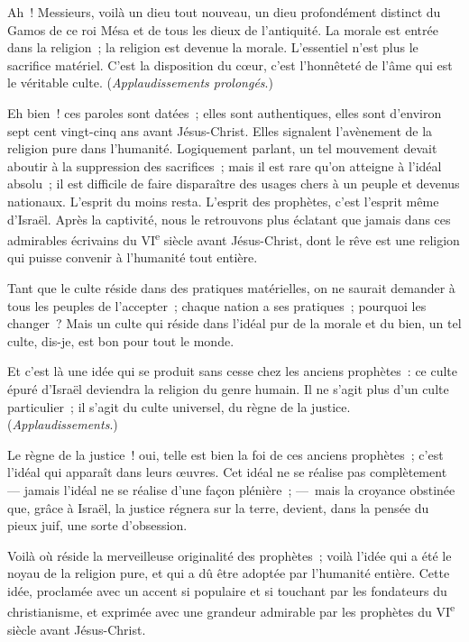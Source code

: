 \documentclass[french,twoside]{book} %
\newcommand\orgName[1]{#1}
\newcommand\persName[1]{#1}
\newcommand\placeName[1]{#1}
\begin{document}
\noindent Ah ! Messieurs, voilà un dieu tout nouveau, un dieu profondément distinct du {\placeName Gamos} de ce {\persName roi Mésa} et de tous les {\orgName dieux de l’antiquité}. La morale est entrée dans la religion ; la religion est devenue la morale. L’essentiel n’est plus le sacrifice matériel. C’est la disposition du cœur, c’est l’honnêteté de l’âme qui est le véritable culte. ({\itshape Applaudissements prolongés}.)\par
Eh bien ! ces paroles sont datées ; elles sont authentiques, elles sont d’environ sept cent vingt-cinq ans avant Jésus-Christ. Elles signalent l’avènement de la religion pure dans l’humanité. Logiquement parlant, un tel mouvement devait aboutir à la suppression des sacrifices ; mais il est rare qu’on atteigne à l’idéal absolu ; il est difficile de faire disparaître des usages chers à un peuple et devenus nationaux. L’esprit du moins resta. L’esprit des prophètes, c’est l’esprit même d’{\orgName Israël}. Après la captivité, nous le retrouvons plus éclatant que jamais dans ces admirables écrivains du VI\textsuperscript{e} siècle avant Jésus-Christ, dont le rêve est une religion qui puisse convenir à l’humanité tout entière.\par
Tant que le culte réside dans des pratiques matérielles, on ne saurait demander à tous les peuples de l’accepter ; chaque nation a ses pratiques ; pourquoi les changer ? Mais un culte qui réside dans l’idéal pur de la morale et du bien, un tel culte, dis-je, est bon pour tout le monde.\par
Et c’est là une idée qui se produit sans cesse chez les anciens prophètes : ce culte épuré d’{\orgName Israël} deviendra la religion du genre humain. Il ne s’agit plus d’un culte particulier ; il s’agit du culte universel, du règne de la justice. ({\itshape Applaudissements}.)\par
Le règne de la justice ! oui, telle est bien la foi de ces anciens prophètes ; c’est l’idéal qui apparaît dans leurs œuvres. Cet idéal ne se réalise pas complètement — jamais l’idéal ne se réalise d’une façon plénière ; — mais la croyance obstinée que, grâce à Israël, la justice régnera sur la terre, devient, dans la pensée du pieux juif, une sorte d’obsession.\par
Voilà où réside la merveilleuse originalité des prophètes ; voilà l’idée qui a été le noyau de la religion pure, et qui a dû être adoptée par l’humanité entière. Cette idée, proclamée avec un accent si populaire et si touchant par les fondateurs du christianisme, et exprimée avec une grandeur admirable par les prophètes du VI\textsuperscript{e} siècle avant Jésus-Christ.\par
\end{document}
